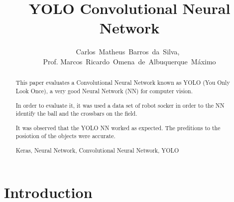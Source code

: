 \documentclass[journal]{IEEEtran}
\begin{document}
    \title{YOLO Convolutional Neural Network}
  \author{Carlos~Matheus~Barros~da~Silva,~\\Prof. Marcos~Ricardo~Omena~de~Albuquerque~Máximo}


\maketitle


\begin{abstract}

This paper evaluates a Convolutional Neural Network known as YOLO (You Only Look Once), a very good Neural Network (NN) for computer vision.

In order to evaluate it, it was used a data set of robot socker in order to the NN identify the ball and the crossbars on the field.

It was observed that the YOLO NN worked as expected. The preditions to the posiotion of the objects were accurate.

\begin{IEEEkeywords}
    Keras, Neural Network, Convolutional Neural Network, YOLO
\end{IEEEkeywords}
\end{abstract}

\IEEEpeerreviewmaketitle



\section{Introduction}
\end{document}
